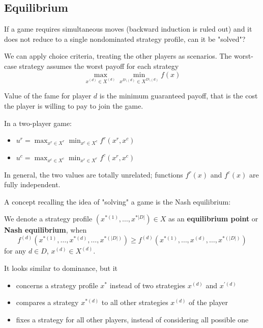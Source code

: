 \subsection{Equilibrium}

If a game requires simultaneous moves (backward induction is ruled out) and it does not reduce to a single nondominated strategy profile, can it be "solved"? 

We can apply choice criteria, treating the other players as scenarios. The worst-case strategy assumes the worst payoff for each strategy
$$ \max_{x^{(d)} \in X^{(d)}} \min_{x^{D \setminus (d)} \in X^{D \setminus (d)}} f(x) $$

Value of the fame for player $d$ is the minimum guaranteed payoff, that is the cost the player is willing to pay to join the game.

In a two-player game: 
\begin{itemize}
	\item $u^r = \max_{x^r \in X^r} \min_{x^c \in X^c} f^r (x^r, x^c)$
	
	\item $u^c = \max_{x^c \in X^c} \min_{x^r \in X^r} f^c (x^r, x^c)$
\end{itemize}
In general, the two values are totally unrelated; functions $f^r(x)$ and $f^c(x)$ are fully independent.

A concept recalling the idea of "solving" a game is the Nash equilibrium: \\

\begin{definition}
	We denote a strategy profile $\left(x^{\ast (1)}, \dots, x^{\ast |D|}\right) \in X$ as an \textbf{equilibrium point} or \textbf{Nash equilibrium}, when
	$$ f^{(d)} \left(x^{\ast (1)}, \dots, x^{\ast (d)}, \dots, x^{\ast (|D|)}\right) \geq f^{(d)} \left(x^{\ast (1)}, \dots, x^{(d)}, \dots, x^{\ast (|D|)}\right) $$
	for any $d \in D$, $x^{(d)} \in X^{(d)}$.
\end{definition}

It looks similar to dominance, but it
\begin{itemize}
	\item concerns a strategy profile $x^\ast$ instead of two strategies $x^{(d)}$ and $x^{'(d)}$
	
	\item compares a strategy $x^{\ast (d)}$ to all other strategies $x^{(d)}$ of the player 
	
	\item fixes a strategy for all other players, instead of considering all possible one 
\end{itemize}

